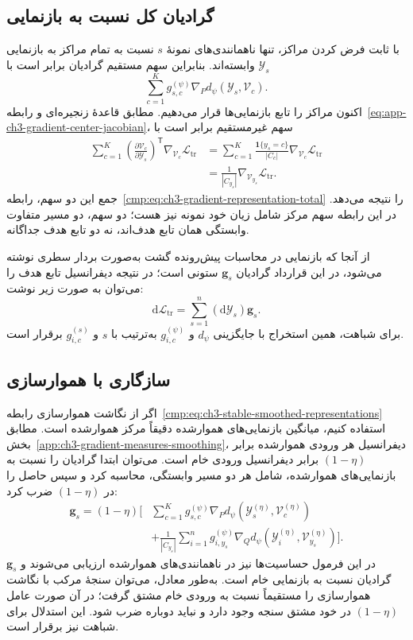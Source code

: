 \subsection{گرادیان کل نسبت به بازنمایی}
\label{app:ch3-gradient-representation-total}

با ثابت فرض کردن مراکز، تنها ناهمانندی‌های
نمونهٔ $s$ نسبت به تمام مراکز به بازنمایی
$\mathscr Y_s$ وابسته‌اند. بنابراین سهم مستقیم
گرادیان برابر است با
\[
\sum_{c=1}^{K}g_{s,c}^{(\psi)}
\nabla_P d_\psi(\mathscr Y_s,\mathcal V_c).
\]
اکنون مراکز را تابع بازنمایی‌ها قرار می‌دهیم.
مطابق قاعدهٔ زنجیره‌ای و
رابطه~\eqref{eq:app-ch3-gradient-center-jacobian}،
سهم غیرمستقیم برابر است با
\[
\begin{aligned}
\sum_{c=1}^{K}
\left(\frac{\partial\mathcal V_c}
{\partial\mathscr Y_s}\right)^{\mathsf T}
\nabla_{\mathcal V_c}\mathcal L_{\mathrm{tr}}
&=\sum_{c=1}^{K}
\frac{\mathbf1\{y_s=c\}}{|C_c|}
\nabla_{\mathcal V_c}\mathcal L_{\mathrm{tr}}\\
&=\frac1{|C_{y_s}|}
\nabla_{\mathcal V_{y_s}}\mathcal L_{\mathrm{tr}}.
\end{aligned}
\]
جمع این دو سهم،
رابطه~\eqref{cmp:eq:ch3-gradient-representation-total}
را نتیجه می‌دهد. در این رابطه سهم مرکز شامل
زیان خود نمونه نیز هست؛ دو سهم، دو مسیر
متفاوت وابستگی همان تابع هدف‌اند، نه دو
تابع هدف جداگانه.

از آنجا که بازنمایی در محاسبات پیش‌رونده
گشت به‌صورت بردار سطری نوشته می‌شود، در این
قرارداد گرادیان $\mathbf g_s$ ستونی است؛
در نتیجه دیفرانسیل تابع هدف را می‌توان به
صورت زیر نوشت:
\[
\mathrm d\mathcal L_{\mathrm{tr}}
=\sum_{s=1}^{n}(\mathrm d\mathscr Y_s)\mathbf g_s.
\]
برای شباهت، همین استخراج با جایگزینی
$d_\psi$ و $g_{i,c}^{(\psi)}$ به‌ترتیب با
$s$ و $g_{i,c}^{(s)}$ برقرار است.

\subsection{سازگاری با هموارسازی}
\label{app:ch3-gradient-centers-smoothing}

اگر از نگاشت هموارسازی
رابطه~\eqref{cmp:eq:ch3-stable-smoothed-representations}
استفاده کنیم، میانگین بازنمایی‌های هموارشده
دقیقاً مرکز هموارشده است. مطابق
بخش~\ref{app:ch3-gradient-measures-smoothing}،
دیفرانسیل هر ورودی هموارشده برابر
$(1-\eta)$ برابر دیفرانسیل ورودی خام است.
می‌توان ابتدا گرادیان را نسبت به بازنمایی‌های
هموارشده، شامل هر دو مسیر وابستگی، محاسبه کرد
و سپس حاصل را در $(1-\eta)$ ضرب کرد:
\[
\begin{aligned}
\mathbf g_s
=(1-\eta)\Bigg[
&\sum_{c=1}^{K}g_{s,c}^{(\psi)}
\nabla_P d_\psi(\mathscr Y_s^{(\eta)},\mathcal V_c^{(\eta)})\\
&+\frac1{|C_{y_s}|}\sum_{i=1}^{n}
g_{i,y_s}^{(\psi)}
\nabla_Q d_\psi(\mathscr Y_i^{(\eta)},\mathcal V_{y_s}^{(\eta)})
\Bigg].
\end{aligned}
\]
در این فرمول حساسیت‌ها نیز در ناهمانندی‌های
هموارشده ارزیابی می‌شوند و $\mathbf g_s$
گرادیان نسبت به بازنمایی خام است. به‌طور
معادل، می‌توان سنجهٔ مرکب با نگاشت هموارسازی
را مستقیماً نسبت به ورودی خام مشتق گرفت؛
در آن صورت عامل $(1-\eta)$ در خود مشتق
سنجه وجود دارد و نباید دوباره ضرب شود.
این استدلال برای شباهت نیز برقرار است.

